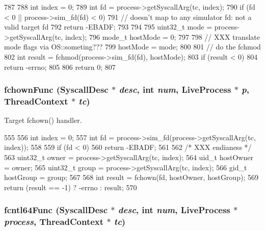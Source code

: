 \begin{DoxyCode}
787 {
788     int index = 0;
789     int fd = process->getSyscallArg(tc, index);
790     if (fd < 0 || process->sim_fd(fd) < 0) {
791         // doesn't map to any simulator fd: not a valid target fd
792         return -EBADF;
793     }
794 
795     uint32_t mode = process->getSyscallArg(tc, index);
796     mode_t hostMode = 0;
797 
798     // XXX translate mode flags via OS::someting???
799     hostMode = mode;
800 
801     // do the fchmod
802     int result = fchmod(process->sim_fd(fd), hostMode);
803     if (result < 0)
804         return -errno;
805 
806     return 0;
807 }
\end{DoxyCode}
\hypertarget{syscall__emul_8hh_ac6c9a2c70e0ab95d055e01fb41987854}{
\subsubsection[{fchownFunc}]{ fchownFunc ({\bf SyscallDesc} $\ast$ {\em desc}, \/  int {\em num}, \/  {\bf LiveProcess} $\ast$ {\em p}, \/  {\bf ThreadContext} $\ast$ {\em tc})}}
\label{syscall__emul_8hh_ac6c9a2c70e0ab95d055e01fb41987854}


Target fchown() handler. 


\begin{DoxyCode}
555 {
556     int index = 0;
557     int fd = process->sim_fd(process->getSyscallArg(tc, index));
558 
559     if (fd < 0)
560         return -EBADF;
561 
562     /* XXX endianess */
563     uint32_t owner = process->getSyscallArg(tc, index);
564     uid_t hostOwner = owner;
565     uint32_t group = process->getSyscallArg(tc, index);
566     gid_t hostGroup = group;
567 
568     int result = fchown(fd, hostOwner, hostGroup);
569     return (result == -1) ? -errno : result;
570 }
\end{DoxyCode}
\hypertarget{syscall__emul_8hh_a6e50686b7758443953966999dcd80f40}{
\subsubsection[{fcntl64Func}]{ fcntl64Func ({\bf SyscallDesc} $\ast$ {\em desc}, \/  int {\em num}, \/  {\bf LiveProcess} $\ast$ {\em process}, \/  {\bf ThreadContext} $\ast$ {\em tc})}}
\label{syscall__emul_8hh_a6e50686b7758443953966999dcd80f40}


